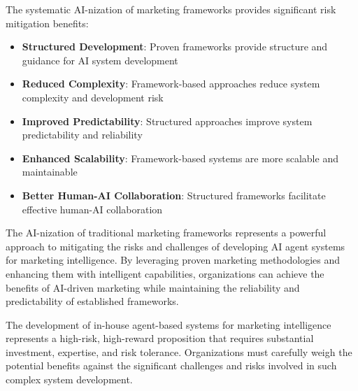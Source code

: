 The systematic AI-nization of marketing frameworks provides significant risk mitigation benefits:

\begin{itemize}
    \item \textbf{Structured Development}: Proven frameworks provide structure and guidance for AI system development
    \item \textbf{Reduced Complexity}: Framework-based approaches reduce system complexity and development risk
    \item \textbf{Improved Predictability}: Structured approaches improve system predictability and reliability
    \item \textbf{Enhanced Scalability}: Framework-based systems are more scalable and maintainable
    \item \textbf{Better Human-AI Collaboration}: Structured frameworks facilitate effective human-AI collaboration
\end{itemize}

The AI-nization of traditional marketing frameworks represents a powerful approach to mitigating the risks and challenges of developing AI agent systems for marketing intelligence. By leveraging proven marketing methodologies and enhancing them with intelligent capabilities, organizations can achieve the benefits of AI-driven marketing while maintaining the reliability and predictability of established frameworks.

The development of in-house agent-based systems for marketing intelligence represents a high-risk, high-reward proposition that requires substantial investment, expertise, and risk tolerance. Organizations must carefully weigh the potential benefits against the significant challenges and risks involved in such complex system development. 

